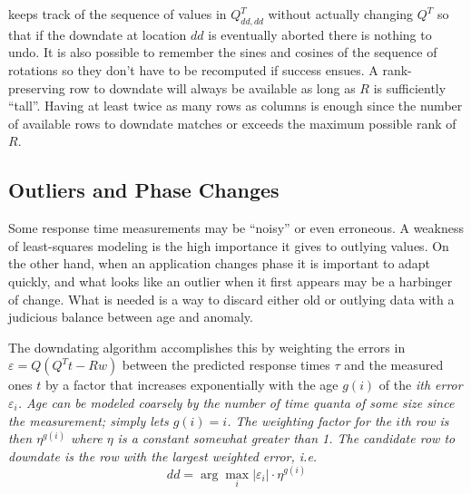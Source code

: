 \pacora keeps track of the sequence of values in $Q^T_{dd,dd}$ without actually changing $Q^T$
so that if the downdate at location $dd$ is eventually aborted there is nothing to undo.
It is also possible to remember the sines and cosines of the sequence of rotations
so they don't have to be recomputed if success ensues.
A rank-preserving row to downdate will always be available as long as $R$ is sufficiently ``tall''.
Having at least twice as many rows as columns is enough since the number of available rows to downdate
matches or exceeds the maximum possible rank of $R$.

\subsection*{Outliers and Phase Changes}

Some response time measurements may be ``noisy'' or even erroneous.
A weakness of least-squares modeling is the high importance it gives to outlying values.
On the other hand, when an application changes phase it is important to adapt quickly,
and what looks like an outlier when it first appears may be a harbinger of change.
What is needed is a way to discard either old or outlying data
with a judicious balance between age and anomaly.

The downdating algorithm accomplishes this by weighting the errors in $\varepsilon = Q(Q^Tt - Rw)$
between the predicted response times $\tau$ and the measured ones $t$ by a factor
that increases exponentially with the age $g(i)$ of the \em{i\/}th error $\varepsilon_i$.
Age can be modeled coarsely by the number of time quanta of some size since the measurement;
\pacora simply lets $g(i) = i$.
The weighting factor for the $i$th row is then $\eta^{g(i)}$ where $\eta$ is a constant somewhat greater than 1.
The candidate row to downdate is the row with the largest weighted error, \emph{i.e.}
\begin{displaymath}
dd = \arg\max_i |\varepsilon_i| \cdot \eta^{g(i)}
\end{displaymath}





